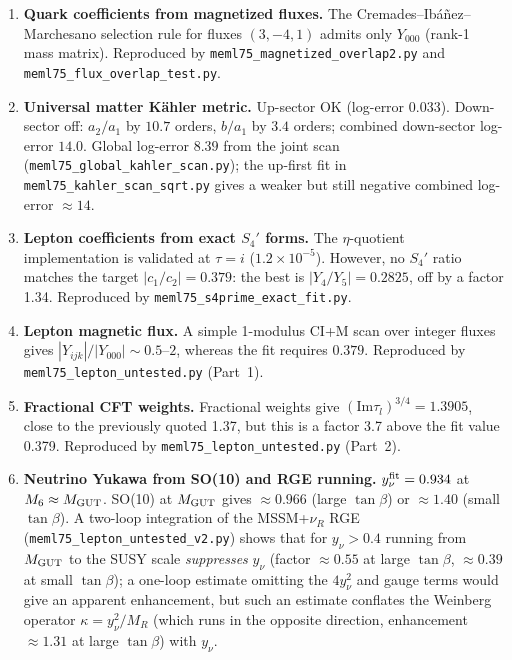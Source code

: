 \documentclass[12pt,a4paper]{article}
\numberwithin{equation}{section}
\begin{document}
\begin{enumerate}[leftmargin=1.5em]
\item \textbf{Quark coefficients from magnetized fluxes.}
The Cremades--Ib\'a\~nez--Marchesano selection rule for fluxes
\((3,-4,1)\) admits only \(Y_{000}\) (rank-1 mass matrix). Reproduced by
\texttt{meml75\_magnetized\_overlap2.py} and
\texttt{meml75\_flux\_overlap\_test.py}.

\item \textbf{Universal matter K\"ahler metric.}
Up-sector OK (log-error 0.033). Down-sector off: \(a_2/a_1\) by
\(10.7\) orders, \(b/a_1\) by \(3.4\) orders; combined down-sector
log-error \(14.0\). Global log-error \(8.39\) from the joint scan
(\texttt{meml75\_global\_kahler\_scan.py}); the up-first fit in
\texttt{meml75\_kahler\_scan\_sqrt.py} gives a weaker but still
negative combined log-error \(\approx 14\).

\item \textbf{Lepton coefficients from exact \(S_4'\) forms.}
The \(\eta\)-quotient implementation is validated at \(\tau=i\)
(\(1.2\times10^{-5}\)). However, no \(S_4'\) ratio matches the target
\(|c_1/c_2|=0.379\): the best is \(|Y_4/Y_5|=0.2825\), off by a
factor 1.34. Reproduced by \texttt{meml75\_s4prime\_exact\_fit.py}.

\item \textbf{Lepton magnetic flux.}
A simple 1-modulus CI+M scan over integer fluxes gives
\(|Y_{ijk}|/|Y_{000}|\sim 0.5\)--\(2\), whereas the fit requires
\(0.379\). Reproduced by \texttt{meml75\_lepton\_untested.py} (Part~1).

\item \textbf{Fractional CFT weights.}
Fractional weights give \((\mathrm{Im}\tau_l)^{3/4} = 1.3905\),
close to the previously quoted 1.37, but this is a factor 3.7 above
the fit value 0.379. Reproduced by
\texttt{meml75\_lepton\_untested.py} (Part~2).

\item \textbf{Neutrino Yukawa from SO(10) and RGE running.}
\(y_\nu^{\rm fit}=0.934\) at \(M_6 \approx M_{\rm GUT}\). SO(10) at
\(M_{\rm GUT}\) gives \(\approx0.966\) (large \(\tan\beta\)) or
\(\approx1.40\) (small \(\tan\beta\)). A two-loop integration of the
MSSM+$\nu_R$ RGE (\texttt{meml75\_lepton\_untested\_v2.py}) shows
that for \(y_\nu>0.4\) running from \(M_{\rm GUT}\) to the SUSY scale
\emph{suppresses} \(y_\nu\) (factor \(\approx0.55\) at large
\(\tan\beta\), \(\approx0.39\) at small \(\tan\beta\)); a one-loop
estimate omitting the \(4y_\nu^2\) and gauge terms would give an
apparent enhancement, but such an estimate conflates the Weinberg
operator \(\kappa = y_\nu^2/M_R\) (which runs in the opposite
direction, enhancement \(\approx1.31\) at large \(\tan\beta\)) with
\(y_\nu\).


\end{enumerate}
\end{document}
